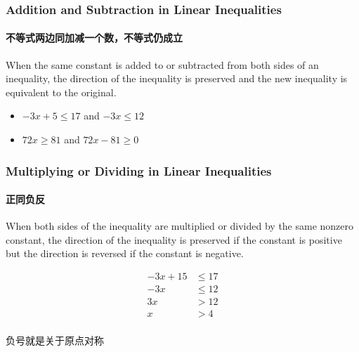 \documentclass[
	11pt, %
	handout,
]{beamer}
\begin{document}

\begin{frame}
	\frametitle{Addition and Subtraction in  Linear Inequalities}
	\framesubtitle{不等式两边同加减一个数，不等式仍成立}

	\begin{theorem}[Rule 1]
		When the same constant is added to or subtracted from both sides of an inequality, the direction of the inequality is preserved and the new inequality is equivalent to the original.
	\end{theorem}

	\begin{example}
		\begin{itemize}
			\item   $-3x +5 \leq 17 $ and $-3x \leq 12$
			\item   $72x  \geq 81 $ and $72x  -81 \geq 0 $
		\end{itemize}
	\end{example}

\end{frame}




\begin{frame}
	\frametitle{Multiplying or Dividing in  Linear Inequalities}
	\framesubtitle{正同负反}
	\begin{theorem}[Rule 2]
		When both sides of the inequality are multiplied or divided by the same nonzero constant, the direction of the inequality is \alert{preserved if the constant is positive} but the direction is \alert{reversed if the constant is negative}.
	\end{theorem}

	\begin{example}
	  \begin{equation*}
	  	\begin{split}
	  		-3x + 15 &\leq 17\\
	  		-3x &\leq 12 \\
	  		3x &>12 \\
	  		x &> 4\\
	  	\end{split}
	  \end{equation*}
	\end{example}
\alert{负号就是关于原点对称}
\end{frame}

\end{document}
